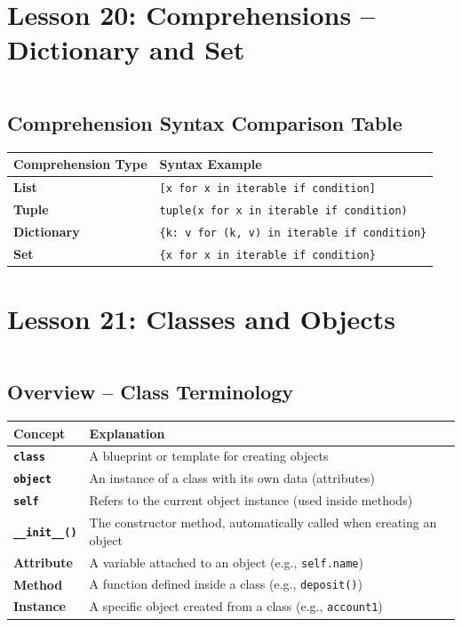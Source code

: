 \documentclass[a4paper,11pt]{article}
\begin{document}
	\section{Lesson 20: Comprehensions – Dictionary and Set}
	\inputminted{python}{Python_Files/comprehensions_dict_set_guid.py}
	
	\vspace{1em}
	\subsection*{Comprehension Syntax Comparison Table}
	
	\renewcommand{\arraystretch}{1.6}
	\begin{tabular}{>{\bfseries}p{3.5cm} p{8.5cm}}
		\toprule
		Comprehension Type & Syntax Example \\
		\midrule
		
		List & \texttt{[x for x in iterable if condition]} \\
		Tuple & \texttt{tuple(x for x in iterable if condition)} \\
		Dictionary & \texttt{\{k: v for (k, v) in iterable if condition\}} \\
		Set & \texttt{\{x for x in iterable if condition\}} \\
		
		\bottomrule
	\end{tabular}
	
\section{Lesson 21: Classes and Objects}
\inputminted{python}{Python_Files/class_intro_guid.py}

\vspace{1em}
\subsection*{Overview – Class Terminology}

\renewcommand{\arraystretch}{1.6}
\begin{tabular}{>{\bfseries}p{3.8cm} p{9.2cm}}
	\toprule
	Concept & Explanation \\
	\midrule
	
	\texttt{class} & A blueprint or template for creating objects \\
	\texttt{object} & An instance of a class with its own data (attributes) \\
	\texttt{self} & Refers to the current object instance (used inside methods) \\
	\texttt{\_\_init\_\_()} & The constructor method, automatically called when creating an object \\
	Attribute & A variable attached to an object (e.g., \texttt{self.name}) \\
	Method & A function defined inside a class (e.g., \texttt{deposit()}) \\
	Instance & A specific object created from a class (e.g., \texttt{account1}) \\
	
	\bottomrule
\end{tabular}
\end{document}
